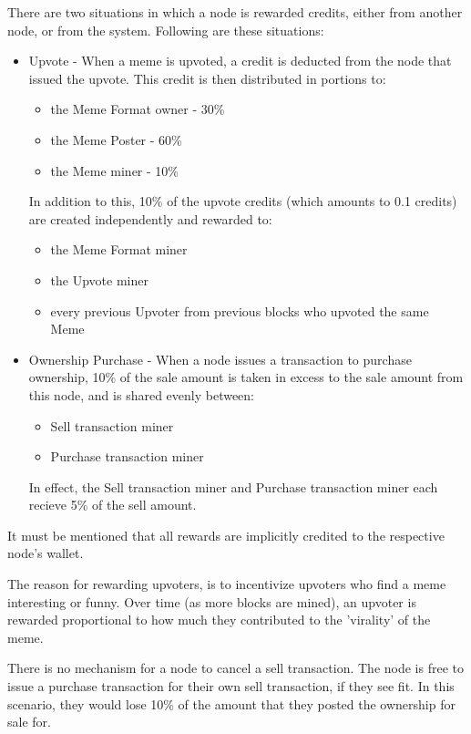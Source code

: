 \documentclass[12pt]{article}
\begin{document}
There are two situations in which a node is rewarded credits, either
from another node, or from the system. Following are these situations:

\begin{itemize}
\item Upvote - When a meme is upvoted, a credit is deducted from the
  node that issued the upvote. This credit is then distributed in
  portions to:
  \begin{itemize}
  \item the Meme Format owner - 30\%
  \item the Meme Poster - 60\%
  \item the Meme miner - 10\%
  \end{itemize}
  In addition to this, 10\% of the upvote credits (which amounts to
  0.1 credits) are created independently and rewarded to:
  \begin{itemize}
  \item the Meme Format miner
  \item the Upvote miner
  \item every previous Upvoter from previous blocks who upvoted the
    same Meme
  \end{itemize}
\item Ownership Purchase - When a node issues a transaction to
  purchase ownership, 10\% of the sale amount is taken in excess to
  the sale amount from this node, and is shared evenly between:
  \begin{itemize}
  \item Sell transaction miner
  \item Purchase transaction miner
  \end{itemize}
  In effect, the Sell transaction miner and Purchase transaction miner
  each recieve 5\% of the sell amount.
\end{itemize}

It must be mentioned that all rewards are implicitly credited to the
respective node's wallet.

The reason for rewarding upvoters, is to incentivize upvoters who find
a meme interesting or funny. Over time (as more blocks are mined), an
upvoter is rewarded proportional to how much they contributed to the
'virality' of the meme.

There is no mechanism for a node to cancel a sell transaction. The
node is free to issue a purchase transaction for their own sell
transaction, if they see fit. In this scenario, they would lose 10\%
of the amount that they posted the ownership for sale for.
\end{document}
